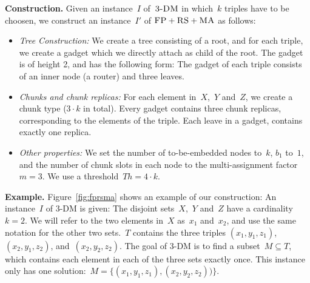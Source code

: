 \documentclass[preprint,12pt]{elsarticle}
\newcommand{\maciek}[1]{\textcolor{brown}{maciek: #1}}
\newcommand{\stefan}[1]{\textcolor{blue}{stefan: #1}}
\newcommand{\MaFactor}{m}
\newcommand{\FP}{\textsc{FP}}
\newcommand{\RS}{\textsc{RS}}
\newcommand{\MA}{\textsc{MA}}
\newcommand{\CostTrans}{\ensuremath{b_1}}
\newcommand{\TDM}{\textsc{3-DM}}
\newcommand{\Thr}{\ensuremath{Th}}
\begin{document}
\textbf{Construction.}
Given an instance~$I$ of~$\TDM$ in which~$k$ triples have to be
choosen, we construct an instance~$I'$ of
$\FP+\RS+\MA$ as follows:
\begin{itemize}
\item \emph{Tree Construction:} We create a tree consisting of a root,
and for each triple, we create a gadget which we directly attach as
child of the root. The gadget is of height 2,
and has the following form:
The gadget of each triple consists of an inner node (a router) and three leaves.
\item \emph{Chunks and chunk replicas:} For each element in~$X$,~$Y$ and~$Z$,
 we create a chunk type
($3 \cdot k$ in total). Every gadget contains three chunk replicas,
corresponding to the elements of the triple. Each leave in a gadget, contains
exactly one replica.
\item \emph{Other properties:} We set the number of to-be-embedded nodes to~$k$,
$\CostTrans$ to~$1$, and the number of chunk slots in each node to the multi-assignment factor
$\MaFactor=3$.
We use a threshold~$\Thr= 4
\cdot k$.
\end{itemize}

\textbf{Example.} Figure~\ref{fig:fprsma} shows an example of our construction: An
instance~$I$ of 3-DM is given: The disjoint sets~$X$,~$Y$ and~$Z$ have a
cardinality~$k=2$. We will refer to the two elements in~$X$ as~$x_1$ and~$x_2$,
and use the same notation for the other two sets.~$T$ contains the three triples
$(x_1, y_1,
z_1)$,~$(x_2, y_1, z_2)$, and~$(x_2, y_2, z_2)$. The goal of 3-DM is to find a
subset~$M \subseteq T$, which contains each element in each of the three sets
exactly once. This instance only has one solution:~$M =
\{(x_1,y_1,z_1),(x_2,y_2,z_2))\}$.
\end{document}
